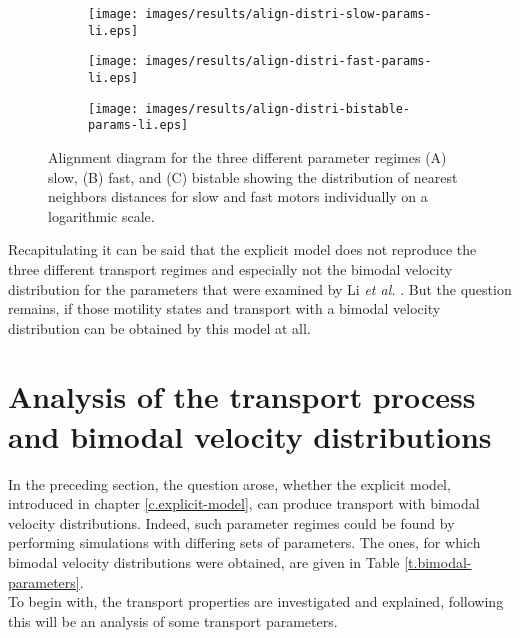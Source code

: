 \renewcommand{\thesubfigure}{\Alph{subfigure}}
\begin{figure}
\centering
\captionsetup[subfigure]{justification=justified,singlelinecheck=false,labelformat=simple}
\begin{subfigure}{0.49\textwidth}
 \subcaption{}
 \texttt{[image: images/results/align-distri-slow-params-li.eps]}
\end{subfigure}
\begin{subfigure}{0.49\textwidth}
 \subcaption{}
 \texttt{[image: images/results/align-distri-fast-params-li.eps]}
\end{subfigure}
\begin{subfigure}{0.49\textwidth}
 \subcaption{}
 \texttt{[image: images/results/align-distri-bistable-params-li.eps]}
\end{subfigure}
\caption[Alignment of motors for the parameters of Larson \textit{et al.} and the three motility regimes found by Li \textit{et al.} ]{Alignment diagram for the three different parameter regimes (A) slow, (B) fast, and (C) bistable showing the distribution of nearest neighbors distances for slow and fast motors individually on a logarithmic scale.}
\label{img.motor-alignment-li-params}
\end{figure}
\renewcommand{\thesubfigure}{\alph{subfigure}}

Recapitulating it can be said that the explicit model does not reproduce the three different transport regimes and especially not the bimodal velocity distribution for the parameters that were
examined by Li \textit{et al.} \cite{li}. But the question remains, if those motility states and transport with a bimodal velocity distribution can be obtained by this model at all.

\section{Analysis of the transport process and bimodal velocity distributions}\label{s.analysing-the-transport-process}
In the preceding section, the question arose, whether the explicit model, introduced in chapter \ref{c.explicit-model}, can produce transport with bimodal velocity distributions. Indeed, such
parameter regimes could be found by performing simulations with differing sets of parameters. The ones, for which bimodal velocity distributions were obtained, are given in Table
\ref{t.bimodal-parameters}. \\
To begin with, the transport properties are investigated and explained, following this will be an analysis of some transport parameters.

